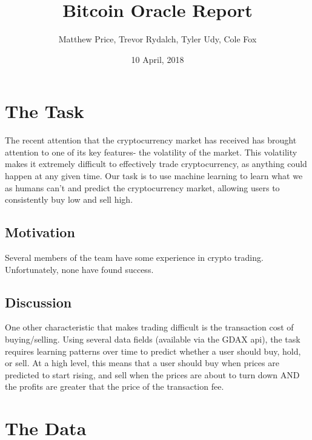 \documentclass[fleqn,11pt]{article}
\begin{document}
\lstset{
  language=Python,
  basicstyle=\small,          %
  keywordstyle=\bfseries,
  identifierstyle=,           %
  commentstyle=,              %
  stringstyle=\ttfamily,      %
  showstringspaces=false,     %
  numbers=left,
  numberstyle=\tiny,
  numbersep=5pt,
  frame=tb,
}

\title{Bitcoin Oracle Report}

\author{Matthew Price, Trevor Rydalch, Tyler Udy, Cole Fox}

\date{10 April, 2018}

\maketitle

\section{ The Task }
The recent attention that the cryptocurrency market has received has brought attention to one of its key features- the volatility of the market. This volatility makes it extremely difficult to effectively trade cryptocurrency, as anything could happen at any given time. Our task is to use machine learning to learn what we as humans can't and predict the cryptocurrency market, allowing users to consistently buy low and sell high.

\subsection{ Motivation }
Several members of the team have some experience in crypto trading. Unfortunately, none have found success. 

\subsection{ Discussion }
One other characteristic that makes trading difficult is the transaction cost of buying/selling. Using several data fields (available via the GDAX api), the task requires learning patterns over time to predict whether a user should buy, hold, or sell. At a high level, this means that a user should buy when prices are predicted to start rising, and sell when the prices are about to turn down AND the profits are greater that the price of the transaction fee.

\section{ The Data }
\end{document}
